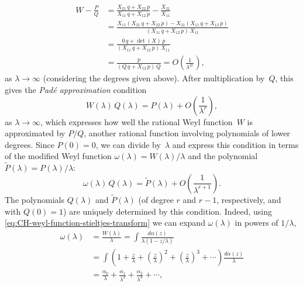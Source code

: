\documentclass[10pt,a4paper]{article} \pdfoutput=1 
\begin{document}
\begin{equation*}
  \begin{split}
    W - \frac{P}{Q}
    &
    = \frac{X_{21} \, q + X_{22} \, p}{X_{11} \, q + X_{12} \, p}
    - \frac{X_{21}}{X_{11}}
    \\ &
    = \frac{X_{11} (X_{21} \, q + X_{22} \, p) - X_{21} (X_{11} \, q + X_{12} \, p)}{(X_{11} \, q + X_{12} \, p) \, X_{11}}
    \\ &
    = \frac{0 \, q + \det(X) \, p}{(X_{11} \, q + X_{12} \, p) \, X_{11}}
    \\ &
    = \frac{p}{(Q \, q + X_{12} \, p) \, Q}
    = O \left( \frac{1}{\lambda^{2r}} \right)
    ,
  \end{split}
\end{equation*}
as $\lambda \to \infty$ (considering the degrees given above).
After multiplication by~$Q$, this gives
the \emph{Padé approximation} condition
\begin{equation*}
  W(\lambda) \, Q(\lambda)
  = P(\lambda)
  + O \left( \frac{1}{\lambda^{r}} \right)
  ,
\end{equation*}
as $\lambda \to \infty$,
which expresses how well the rational Weyl function~$W$
is approximated by $P/Q$, another rational function involving polynomials of lower degrees.
Since $P(0)=0$, we can divide by~$\lambda$ and express this condition
in terms of the modified Weyl function $\omega(\lambda) = W(\lambda)/\lambda$
and the polynomial $\widetilde P(\lambda) = P(\lambda)/\lambda$:
\begin{equation}
  \label{eq:CH-first-pade-approx}
  \omega(\lambda) \, Q(\lambda)
  = \widetilde P(\lambda)
  + O \left( \frac{1}{\lambda^{r+1}} \right)
  .
\end{equation}
The polynomials $Q(\lambda)$ and $\widetilde P(\lambda)$
(of degree $r$ and $r-1$, respectively,
and with $Q(0)=1$)
are uniquely determined by this condition.
Indeed, using \eqref{eq:CH-weyl-function-stieltjes-transform} we
can expand $\omega(\lambda)$ in powers of $1/\lambda$,
\begin{equation}
  \label{eq:CH-W-power-series}
  \begin{split}
    \omega(\lambda)
    &
    = \frac{W(\lambda)}{\lambda}
    = \int \frac{d\alpha(z)}{\lambda (1-z/\lambda)}
    \\ &
    = \int \left( 1 + \frac{z}{\lambda}
      + \left( \frac{z}{\lambda} \right)^2
      + \left( \frac{z}{\lambda} \right)^3
      + \dotsb \right) \frac{d\alpha(z)}{\lambda}
    \\ &
    = \frac{\alpha_0}{\lambda} + \frac{\alpha_1}{\lambda^2} + \frac{\alpha_2}{\lambda^3} + \dotsb
    ,
  \end{split}
\end{equation}
\end{document}
